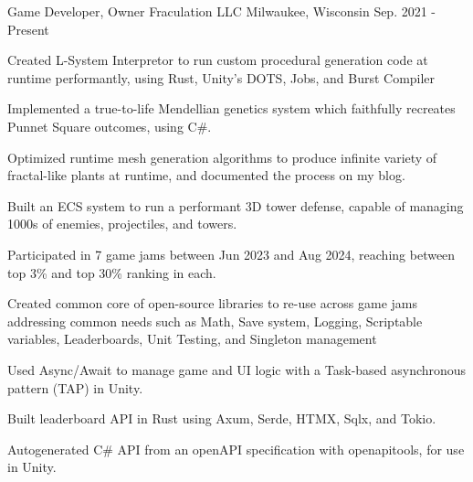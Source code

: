 \begin{cventries}
\cventry
{Game Developer, Owner} %
{Fraculation LLC} %
{Milwaukee, Wisconsin} %
{Sep. 2021 - Present} %
{
  \begin{cvitems} %
    \item {Created L-System Interpretor to run custom procedural generation code at runtime performantly, using Rust, Unity's DOTS, Jobs, and Burst Compiler}
    \item {Implemented a true-to-life Mendellian genetics system which faithfully recreates Punnet Square outcomes, using C\#.}
    \item {Optimized runtime mesh generation algorithms to produce infinite variety of fractal-like plants at runtime, and documented the process on my blog.}
    \item {Built an ECS system to run a performant 3D tower defense, capable of managing 1000s of enemies, projectiles, and towers.}
    \item {Participated in 7 game jams between Jun 2023 and Aug 2024, reaching between top 3\% and top 30\% ranking in each.}
    \item {Created common core of open-source libraries to re-use across game jams addressing common needs such as Math, Save system, Logging, Scriptable variables, Leaderboards, Unit Testing, and Singleton management }
    \item {Used Async/Await to manage game and UI logic with a Task-based asynchronous pattern (TAP) in Unity.}
    \item {Built leaderboard API in Rust using Axum, Serde, HTMX, Sqlx, and Tokio.}
    \item {Autogenerated C\# API from an openAPI specification with openapitools, for use in Unity.}
  \end{cvitems}
}


\end{cventries}
